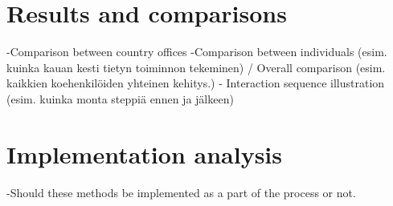 \documentclass[12pt,a4paper,oneside,pdftex]{report}
\begin{document}
    \section{Results and comparisons}
    \label{sec:results}
    -Comparison between country offices
    -Comparison between individuals (esim. kuinka kauan kesti tietyn toiminnon tekeminen) / Overall comparison (esim. kaikkien koehenkilöiden yhteinen kehitys.)
- Interaction sequence illustration (esim. kuinka monta steppiä ennen ja jälkeen)

    \section{Implementation analysis}
    \label{sec:implementationanalysis}
    -Should these methods be implemented as a part of the process or not.







\end{document}
